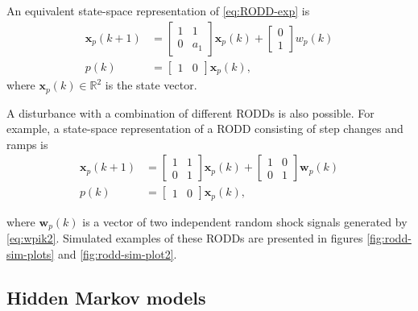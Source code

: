 {An equivalent state-space representation of \eqref{eq:RODD-exp} is
\begin{equation} \label{eq:RODD-ss}
	\begin{split}
		\mathbf{x}_p(k+1) & =\left[\begin{array}{cc}
			1 & 1 \\
			0 & a_1
		\end{array}\right] \mathbf{x}_p(k) +\left[\begin{array}{cc}
			0 \\
			1
		\end{array}\right] w_p(k) \\
		p(k) & =\left[\begin{array}{cc}
			1 & 0
		\end{array}\right] \mathbf{x}_p(k),
	\end{split}
\end{equation}
%
where $\mathbf{x}_p(k) \in \mathbb{R}^2$ is the state vector.

A disturbance with a combination of different \gls{RODD}s is also possible.  For example, a state-space representation of a \gls{RODD} consisting of step changes and ramps is
\begin{equation} \label{eq:RODD-step-ramp}
	\begin{split}
		\mathbf{x}_p(k+1) & =\left[\begin{array}{cc}
			1 & 1 \\
			0 & 1
		\end{array}\right] \mathbf{x}_p(k) +\left[\begin{array}{cc}
			1 & 0 \\
			0 & 1
		\end{array}\right] \mathbf{w}_p(k) \\
		p(k) & =\left[\begin{array}{cc}
			1 & 0
		\end{array}\right] \mathbf{x}_p(k),
	\end{split}
\end{equation}

where $\mathbf{w}_p(k)$ is a vector of two independent random shock signals generated by \eqref{eq:wpik2}. Simulated examples of these \gls{RODD}s are presented in figures \ref{fig:rodd-sim-plots} and \ref{fig:rodd-sim-plot2}.

\subsection{Hidden Markov models} \label{sec:HMM}

}
